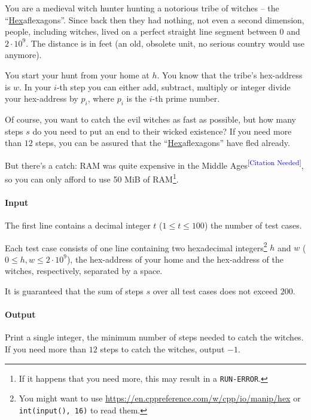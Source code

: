 
\usepackage{hyperref}



\makeheader

You are a medieval witch hunter hunting a notorious tribe of witches -- the “\underline{Hex}aflexagons”.
Since back then they had nothing, not even a second dimension, people, including witches, lived
on a perfect straight line segment between $0$ and $2 \cdot 10^9$. The distance is in feet (an old, obsolete unit,
no serious country would use anymore).

You start your hunt from your home at $h$. You know that the tribe's hex-address is $w$.
In your $i$-th step you can either add, subtract, multiply or integer divide your hex-address by $p_i$,
where $p_i$ is the $i$-th prime number.

Of course, you want to catch the evil witches as fast as possible, but
how many steps $s$ do you need to put an end to their wicked existence?
If you need more than $12$ steps, you can be assured that
the “\underline{Hex}aflexagons” have fled already.

But there's a catch:
RAM was quite expensive in the Middle Ages\textsuperscript{[\textcolor{blue}{Citation Needed}]},
so you can only afford to use 50 MiB of RAM\footnote{If it happens that you need more, this may result in a \texttt{RUN-ERROR}.}.

\paragraph*{Input}

The first line contains a decimal integer $t$ ($1\leq t\leq 100$) the number of test cases.

Each test case consists of one line containing two hexadecimal integers\footnote{You might want to use \url{https://en.cppreference.com/w/cpp/io/manip/hex} or \texttt{int(input(), 16)} to read them.}
$h$ and $w$ ($0 \leq h, w \leq 2\cdot 10^9$), the hex-address of your home and the hex-address of the witches, respectively, separated by a space.

It is guaranteed that the sum of steps $s$ over all test cases does not exceed $200$.

\paragraph*{Output}

Print a single integer, the minimum number of steps needed to catch the witches.
If you need more than $12$ steps to catch the witches, output $-1$.

\begin{samples}
\end{samples}

